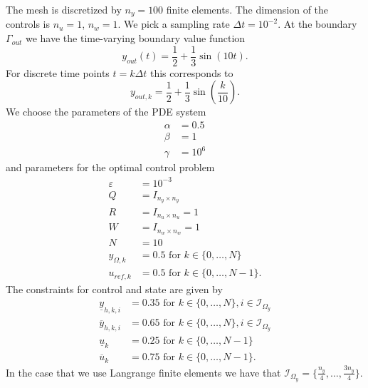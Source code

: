 \documentclass[
12pt, %
a4paper, %
onecolumn, %
portrait %
]{article}
\begin{document}
The mesh is discretized by $n_y = 100$ finite elements. The dimension of the controls is $n_u = 1$, $n_w = 1$. We pick a sampling rate $\Delta t = 10^{-2}$. At the boundary $\Gamma_{out}$ we have the time-varying boundary value function 
\begin{equation}
y_{out}(t) = \frac{1}{2} + \frac{1}{3} \sin(10t).
\end{equation}
For discrete time points $t = k \Delta t$ this corresponds to
\begin{equation}
y_{out,k} = \frac{1}{2} + \frac{1}{3} \sin(\frac{k}{10}).
\end{equation}
We choose the parameters of the PDE system
\begin{align*}
\alpha &= 0.5 \\
\beta &= 1 \\
\gamma &= 10^{6}
\end{align*}
and parameters for the optimal control problem
\begin{align*}
\varepsilon &= 10^{-3} \\
Q &= I_{n_y \times n_y} \\
R &= I_{n_u \times n_u} = 1\\
W &= I_{n_w \times n_w} = 1\\
N &= 10\\
y_{\Omega,k} &= 0.5 \text{ for } k \in \{0, \hdots, N\} \\
u_{ref,k} &= 0.5 \text{ for } k \in \{0, \hdots, N-1\}.
\end{align*}
The constraints for control and state are given by
\begin{align*}
\underline{y}_{h,k,i} &= 0.35  \text{ for } k \in \{0, \hdots, N\}, i \in \mathcal{I}_{\Omega_y}\\
\overline{y}_{h,k,i} &= 0.65  \text{ for } k \in \{0, \hdots, N\}, i \in \mathcal{I}_{\Omega_y}\\
\underline{u}_k &= 0.25 \text{ for } k \in \{0, \hdots, N-1\}\\
\overline{u}_k &= 0.75 \text{ for } k \in \{0, \hdots, N-1\}.
\end{align*}
In the case that we use Langrange finite elements we have that $\mathcal{I}_{\Omega_y} = \{\frac{n_y}{4}, \hdots, \frac{3 n_y}{4}\}$.
\newpage

\renewcommand{\refname}{Reference} %




\end{document}
